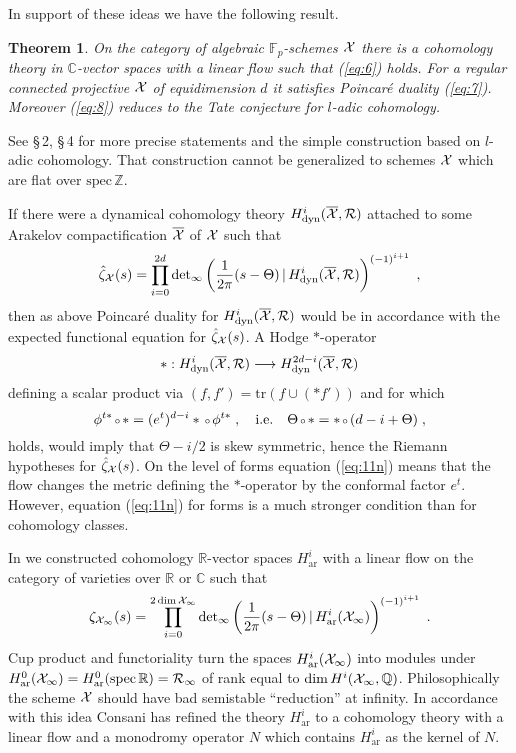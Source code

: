 \documentclass[11pt,leqno]{article}
\newcommand{\C}{{\mathbb{C}}}
\newcommand{\F}{{\mathbb{F}}}
\newcommand{\Q}{{\mathbb{Q}}}
\newcommand{\R}{{\mathbb{R}}}
\newcommand{\Z}{{\mathbb{Z}}}
\newcommand{\ar}{\mathrm{ar}}
\newcommand{\ddet}{\mathrm{det}}
\newcommand{\dyn}{\mathrm{dyn}}
\newcommand{\spec}{\mathrm{spec}\,}
\newcommand{\tr}{\mathrm{tr}}
\newcommand{\Rh}{{\cal R}}
\newcommand{\eX}{{\cal X}}
\newcommand{\tei}{\, | \,}
\newcommand{\verk}{\mbox{\scriptsize $\,\circ\,$}}
\newtheorem{theorem}{Theorem}[section]
\begin{document}
In support of these ideas we have the following result.
\begin{theorem} \label{t3} On the category of algebraic $\F_p$-schemes $\eX$ there is a cohomology theory in $\C$-vector spaces with a linear flow such that {\rm (\ref{eq:6})} holds. For a regular connected projective $\eX$ of equidimension $d$ it satisfies Poincar\'e duality {\rm (\ref{eq:7})}. Moreover {\rm (\ref{eq:8})} reduces to the Tate conjecture for $l$-adic cohomology.
\end{theorem}
See \cite{D3} \S\,2, \cite{D6} \S\,4 for more precise statements and the simple construction based on $l$-adic cohomology. That construction cannot be generalized to schemes $\eX$ which are flat over $\spec \Z$.

If there were a dynamical cohomology theory $H^i_{\dyn} ( \overline{\eX}  , \Rh)$ attached to some Arakelov compactification $\overline{\eX}$ of $\eX$ such that
\[
\hat{\zeta}_{\eX} (s) = \prod^{2d}_{i=0} \ddet_{\infty} \left( \frac{1}{2\pi} (s - \Theta) \tei H^i_{\dyn} ( \overline{\eX}  , \Rh) \right)^{(-1)^{i+1}} \; ,
\]
then as above Poincar\'e duality for $H^i_{\dyn} ( \overline{\eX}  , \Rh)$ would be in accordance with the expected functional equation for $\hat{\zeta}_{\eX} (s)$. A Hodge $\ast$-operator
\[
\ast : H^i_{\dyn} ( \overline{\eX}  , \Rh) \longrightarrow H^{2d-i}_{\dyn} ( \overline{\eX}  , \Rh)
\]
defining a scalar product via $(f,f') = \tr (f \cup (\ast f'))$ and for which
\begin{equation}
\label{eq:11n}
  \phi^{t\ast} \verk \ast = (e^t)^{d-i} \ast \verk \phi^{t\ast} \; , \quad \mbox{i.e.} \quad \Theta \verk \ast = \ast \verk (d-i + \Theta) \; ,
\end{equation}
holds, would imply that $\Theta - i/2$ is skew symmetric, hence the Riemann hypotheses for $\hat{\zeta}_{\eX} (s)$. On the level of forms equation (\ref{eq:11n}) means that the flow changes the metric defining the $\ast$-operator by the conformal factor $e^t$. However, equation (\ref{eq:11n}) for forms is a much stronger condition than for cohomology classes.

In \cite{D2} we constructed cohomology $\R$-vector spaces $H^i_{\ar}$ with a linear flow on the category of varieties over $\R$ or $\C$ such that
\[
\zeta_{\eX_{\infty}} (s) = \prod^{2 \dim \eX_{\infty}}_{i=0} \ddet_{\infty} \left( \frac{1}{2 \pi} (s- \Theta) \tei H^i_{\ar} (\eX_{\infty}) \right)^{(-1)^{i+1}} \; .
\]
Cup product and functoriality turn the spaces $H^i_{\ar} (\eX_{\infty})$ into modules under $H^0_{\ar} (\eX_{\infty}) = H^0_{\ar} (\spec \R) = \Rh_{\infty}$ of rank equal to $\dim H^i (\eX_{\infty} , \Q)$. Philosophically the scheme $\eX$ should have bad semistable ``reduction'' at infinity. In accordance with this idea Consani \cite{Cons} has refined the theory $H^i_{\ar}$ to a cohomology theory with a linear flow and a monodromy operator $N$ which contains $H^i_{\ar}$ as the kernel of $N$.
\end{document}
